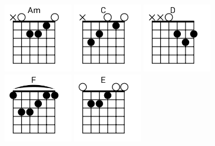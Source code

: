 \begin{figure}[h]
\predtitle\centering
\includegraphics[width=3cm]{../Akordy/am.png}
\includegraphics[width=3cm]{../Akordy/c.png}
\includegraphics[width=3cm]{../Akordy/d.png}
\includegraphics[width=3cm]{../Akordy/f.png}
\includegraphics[width=3cm]{../Akordy/e.png}
\end{figure}
